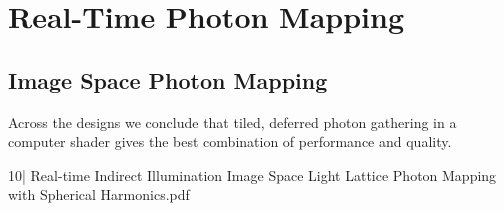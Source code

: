 %
%
%
%
%
%
%
%
%
%
%
%
%
%
%
%
%




\section{Real-Time Photon Mapping}

\subsection{Image Space Photon Mapping}

\cite{a:HardwareAcceleratedGlobalIlluminationbyImageSpacePhotonMapping}


Across the designs we conclude that tiled, deferred photon gathering in a computer shader gives the best combination of performance and quality.


10| Real-time Indirect Illumination Image Space Light Lattice Photon Mapping with Spherical Harmonics.pdf

\cite{a:TowardPracticalRealTimePhotonMapping:EfficientGPUDensityEstimation}

